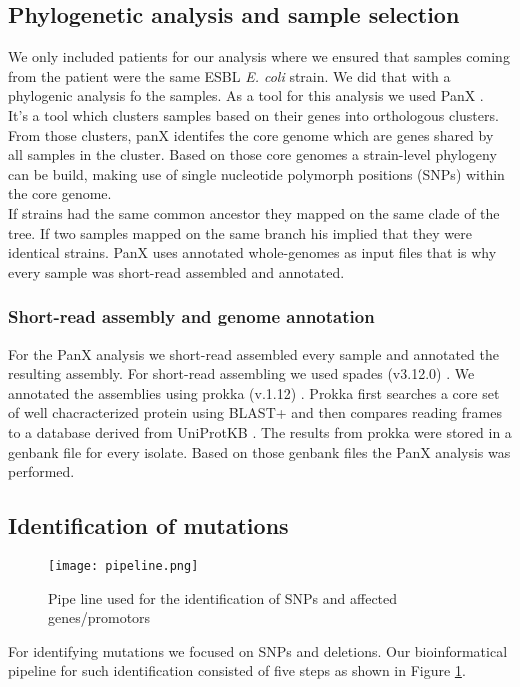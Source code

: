 \subsection{Phylogenetic analysis and sample selection}
We only included patients for our analysis where we ensured that samples coming from the patient were the same ESBL \textit{E. coli} strain. We did that with a phylogenic analysis fo the samples. As a tool for this analysis we used PanX \cite{ding_panx:_2018}. \\
It's a tool which clusters samples based on their genes into orthologous clusters. From those clusters, panX identifes the core genome which are genes shared by all samples in the cluster. Based on those core genomes a strain-level phylogeny can be build, making use of single nucleotide polymorph positions (SNPs) within the core genome. \\ 
If strains had the same common ancestor they mapped on the same clade of the tree. If two samples mapped on the same branch his implied that they were identical strains. PanX uses annotated whole-genomes as input files that is why every sample was short-read assembled and annotated.

\subsubsection{Short-read assembly and genome annotation}
For the PanX analysis we short-read assembled every sample and annotated the resulting assembly. For short-read assembling we used spades (v3.12.0) \cite{nurk_assembling_2013}. We annotated the assemblies using prokka (v.1.12) \cite{seemann_prokka:_2014}. Prokka first searches a core set of well chacracterized protein using BLAST+ and then compares reading frames to a database derived from UniProtKB \cite{seemann_:zap:_2019}. The results from prokka were stored in a genbank file for every isolate. Based on those genbank files the PanX analysis was performed.  
\label{section:annotation}

\subsection{Identification of mutations}
\begin{figure}
	\texttt{[image: pipeline.png]}
	\caption{Pipe line used for the identification of SNPs and affected genes/promotors}
	\label{figure:pipeline}
\end{figure}
For identifying mutations we focused on SNPs and deletions. Our bioinformatical pipeline for such identification consisted of five steps as shown in Figure \ref{figure:pipeline}. 

